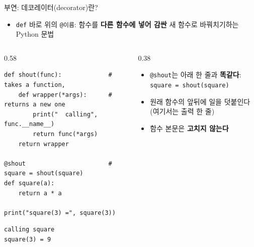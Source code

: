 \documentclass[aspectratio=169,11pt]{beamer}
\newcommand{\code}[1]{\texttt{#1}}
\begin{document}
\begin{frame}[fragile]{부연: 데코레이터(decorator)란?}
\begin{itemize}
\item \code{def} 바로 위의 \code{@이름}: 함수를 \textbf{다른 함수에 넣어 감싼} 새 함수로 바꿔치기하는 Python 문법
\end{itemize}
\begin{columns}[T,onlytextwidth]
\begin{column}{0.58\textwidth}
\begin{lstlisting}
def shout(func):             # takes a function,
    def wrapper(*args):      # returns a new one
        print("  calling", func.__name__)
        return func(*args)
    return wrapper

@shout                       # square = shout(square)
def square(a):
    return a * a

print("square(3) =", square(3))
\end{lstlisting}
\begin{lstlisting}[style=outstyle]
  calling square
square(3) = 9
\end{lstlisting}
\end{column}
\begin{column}{0.38\textwidth}
\small
\begin{itemize}
\item \code{@shout}는 아래 한 줄과 \textbf{똑같다}:
\code{square = shout(square)}
\item 원래 함수의 앞뒤에 일을 덧붙인다 (여기서는 출력 한 줄)
\item 함수 본문은 \textbf{고치지 않는다}
\end{itemize}
\end{column}
\end{columns}
\end{frame}
\end{document}
